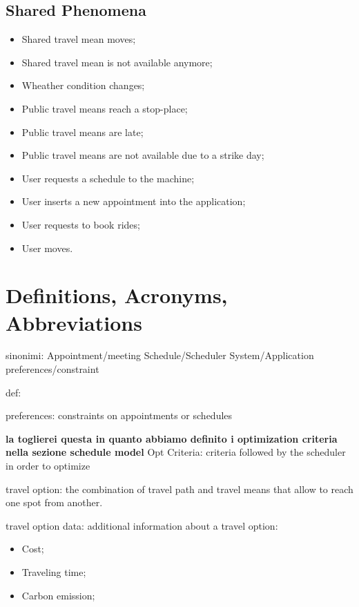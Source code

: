 \subsection{Shared Phenomena}
\begin{itemize}
\item Shared travel mean moves;
\item Shared travel mean is not available anymore;
\item Wheather condition changes;
\item Public travel means reach a stop-place;
\item Public travel means are late; 
\item Public travel means are not available due to a strike day;
\item User requests a schedule to the machine;
\item User inserts a new appointment into the application;
\item User requests to book rides;
\item User moves.
\end{itemize}

\section{Definitions, Acronyms, Abbreviations}

\newtheorem{mydef}{Definition}

sinonimi:
Appointment/meeting
Schedule/Scheduler
System/Application
preferences/constraint

%

def:

preferences: constraints on appointments or schedules

\textbf{la toglierei questa in quanto abbiamo definito i optimization criteria nella sezione schedule model}
Opt Criteria: criteria followed by the scheduler in order to optimize

travel option: the combination of travel path and travel means that allow to reach one spot from another.

travel option data: additional information about a travel option:
\begin{itemize}
\item Cost;
\item Traveling time;
\item Carbon emission;
\end{itemize}

